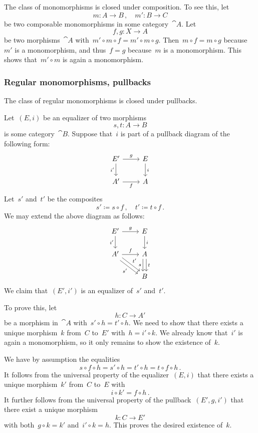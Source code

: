 The class of monomorphisms is closed under composition.
To see this, let
\[
	m \colon A \to B \,,
	\quad
	m' \colon B \to C
\]
be two composable monomorphisms in some category~$\cat{A}$.
Let
\[
	f, g \colon X \to A
\]
be two morphisms~$\cat{A}$ with~$m' ∘ m ∘ f = m' ∘ m ∘ g$.
Then~$m ∘ f = m ∘ g$ because~$m'$ is a monomorphism, and thus~$f = g$ because~$m$ is a monomorphism.
This shows that~$m' ∘ m$ is again a monomorphism.



\subsubsection*{Regular monomorphisms, pullbacks}

The class of regular monomorphisms is closed under pullbacks.

Let~$(E, i)$ be an equalizer of two morphisms
\[
	s, t \colon A \to B
\]
is some category~$\cat{B}$.
Suppose that~$i$ is part of a pullback diagram of the following form:
\[
	\begin{tikzcd}
		E'
		\arrow{r}[above]{g}
		\arrow{d}[left]{i'}
		&
		E
		\arrow{d}[right]{i}
		\\
		A'
		\arrow{r}[below]{f}
		&
		A
	\end{tikzcd}
\]
Let~$s'$ and~$t'$ be the composites
\[
	s' ≔ s ∘ f \,,
	\quad
	t' ≔ t ∘ f \,.
\]
We may extend the above diagram as follows:
\[
	\begin{tikzcd}
		E'
		\arrow{r}[above]{g}
		\arrow{d}[left]{i'}
		&
		E
		\arrow{d}[right]{i}
		\\
		A'
		\arrow{r}[above]{f}
		\arrow[shift right]{dr}[below left]{s'}
		\arrow[shift left]{dr}[above right]{t'}
		&
		A
		\arrow[shift right]{d}[left]{s}
		\arrow[shift left]{d}[right]{t}
		\\
		{}
		&
		B
	\end{tikzcd}
\]
We claim that~$(E', i')$ is an equalizer of~$s'$ and~$t'$.

To prove this, let
\[
	h \colon C \to A'
\]
be a morphism in~$\cat{A}$ with~$s' ∘ h = t' ∘ h$.
We need to show that there exists a unique morphism~$k$ from~$C$ to~$E'$ with~$h = i' ∘ k$.
We already know that~$i'$ is again a monomorphism, so it only remains to show the existence of~$k$.

We have by assumption the equalities
\[
	s ∘ f ∘ h
	=
	s' ∘ h
	=
	t' ∘ h
	=
	t ∘ f ∘ h \,.
\]
It follows from the universal property of the equalizer~$(E, i)$ that there exists a unique morphism~$k'$ from~$C$ to~$E$ with
\[
	i ∘ k' = f ∘ h \,.
\]
It further follows from the universal property of the pullback~$(E', g, i')$ that there exist a unique morphism
\[
	k \colon C \to E'
\]
with both~$g ∘ k = k'$ and~$i' ∘ k = h$.
This proves the desired existence of~$k$.


